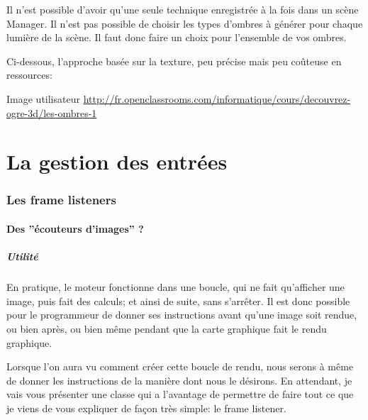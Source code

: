 \documentclass[10pt,a4paper]{report}
\begin{document}
Il n'est possible d'avoir qu'une seule technique enregistr\'ee \`{a} la fois dans un sc\`ene Manager. Il n'est pas possible de choisir les types d'ombres \`{a} g\'en\'erer pour chaque lumi\`ere de la sc\`ene. Il faut donc faire un choix pour l'ensemble de vos ombres.

Ci-dessous, l'approche bas\'ee sur la texture, peu pr\'ecise mais peu co\^uteuse en ressources:

Image utilisateur \url{http://fr.openclassrooms.com/informatique/cours/decouvrez-ogre-3d/les-ombres-1}







\part{La gestion des entr\'ees}




\section{Les frame listeners}





\subsection{Des ''\'ecouteurs d'images'' ?}
\subsubsection{Utilit\'e}


En pratique, le moteur fonctionne dans une boucle, qui ne fait qu'afficher une image, puis fait des calculs; et ainsi de suite, sans s'arr\^eter. Il est donc possible pour le programmeur de donner ses instructions avant qu'une image soit rendue, ou bien apr\`es, ou bien m\^eme pendant que la carte graphique fait le rendu graphique.

Lorsque l'on aura vu comment cr\'eer cette boucle de rendu, nous serons \`{a} m\^eme de donner les instructions de la mani\`ere dont nous le d\'esirons. En attendant, je vais vous pr\'esenter une classe qui a l'avantage de permettre de faire tout ce que je viens de vous expliquer de fa\c{c}on tr\`es simple: le frame listener.
\end{document}

